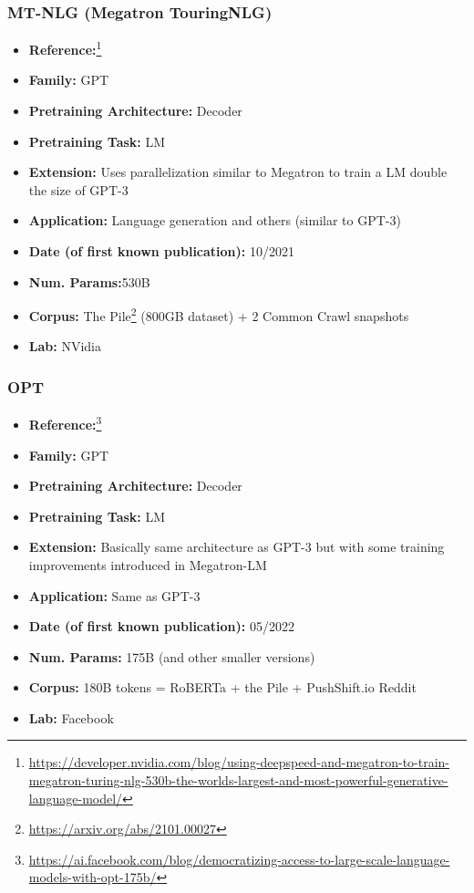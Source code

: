 \documentclass{article}
\begin{document}
\subsubsection{MT-NLG (Megatron TouringNLG)}

            \begin{itemize}
                \item \textbf{Reference:}\footnote{\url{https://developer.nvidia.com/blog/using-deepspeed-and-megatron-to-train-megatron-turing-nlg-530b-the-worlds-largest-and-most-powerful-generative-language-model/}}\cite{smith2022using}
                \item \textbf{Family:} GPT 
                \item \textbf{Pretraining Architecture:} Decoder
                \item \textbf{Pretraining Task:} LM
                \item \textbf{Extension:} Uses parallelization similar to Megatron to train a LM double the size of GPT-3  
                \item \textbf{Application:} Language generation and others (similar to GPT-3)
                \item \textbf{Date (of first known publication):} 10/2021
                \item \textbf{Num. Params:}530B
                \item \textbf{Corpus:} The Pile\footnote{\url{https://arxiv.org/abs/2101.00027}} (800GB dataset) + 2 Common Crawl snapshots
                \item \textbf{Lab:} NVidia
            \end{itemize}

            
\subsubsection{OPT}

            \begin{itemize}
                \item \textbf{Reference:}\footnote{\url{https://ai.facebook.com/blog/democratizing-access-to-large-scale-language-models-with-opt-175b/}}\cite{zhang2022opt}
                \item \textbf{Family:} GPT 
                \item \textbf{Pretraining Architecture:} Decoder
                \item \textbf{Pretraining Task:} LM
                \item \textbf{Extension:} Basically same architecture as GPT-3 but with some training improvements introduced in Megatron-LM  
                \item \textbf{Application:} Same as GPT-3
                \item \textbf{Date (of first known publication):} 05/2022
                \item \textbf{Num. Params:} 175B (and other smaller versions)
                \item \textbf{Corpus:} 180B tokens = RoBERTa + the Pile + PushShift.io Reddit
                \item \textbf{Lab:} Facebook
            \end{itemize}
            
\end{document}
